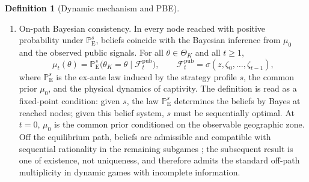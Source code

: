 \documentclass[ecta,nameyear,draft]{econsocart}
\providecommand{\textcite}{\citet}
\theoremstyle{plain}
\theoremstyle{definition}
\newtheorem{definition}[theorem]{Definition}
\newcommand{\ProbE}{\mathbb{P}_{\mathrm{E}}}
\newcommand{\ThetaK}{\Theta_K}
\newcommand{\1}{\mathbf{1}}
\begin{document}
\begin{definition}[Dynamic mechanism and PBE]
\begin{enumerate}
  \item[\textup{(b)}] On-path Bayesian consistency. In every node reached with positive probability under $\ProbE^s$, beliefs coincide with the Bayesian inference from $\mu_0$ and the observed public signals. For all $\theta\in\ThetaK$ and all $t\ge 1$,
  \begin{equation}
  \label{eq:def712-bayes-mu}
  \mu_t(\theta)=\ProbE^s\!\bigl(\theta_K=\theta\mid \mathcal{F}_t^{\mathrm{pub}}\bigr),
  \qquad
  \mathcal{F}_t^{\mathrm{pub}}=\sigma(z,\zeta_0,\ldots,\zeta_{t-1}),
  \end{equation}
  where $\ProbE^s$ is the ex-ante law induced by the strategy profile $s$, the common prior $\mu_0$, and the physical dynamics of captivity. The definition is read as a fixed-point condition: given $s$, the law $\ProbE^s$ determines the beliefs by Bayes at reached nodes; given this belief system, $s$ must be sequentially optimal. At $t=0$, $\mu_0$ is the common prior conditioned on the observable geographic zone. Off the equilibrium path, beliefs are admissible and compatible with sequential rationality in the remaining subgames \textcite{FudenbergTirole1991,KrepsWilson1982}; the subsequent result is one of existence, not uniqueness, and therefore admits the standard off-path multiplicity in dynamic games with incomplete information.
\end{enumerate}
\end{definition}
\end{document}
